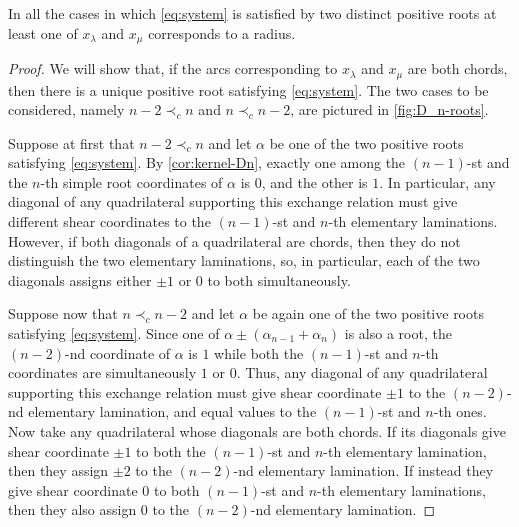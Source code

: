 \documentclass[pdftex]{sigma}
\numberwithin{equation}{section}
\numberwithin{theorem}{section}
\numberwithin{proposition}{section}
\numberwithin{lemma}{section}
\numberwithin{corollary}{section}
\numberwithin{definition}{section}
\numberwithin{example}{section}
\numberwithin{remark}{section}
\numberwithin{note}{section}
\begin{document}
  \begin{lemma}
    \label{lem:is-radius}
    In all the cases in which \cref{eq:system} is satisfied by two distinct positive roots at least one of $x_\lambda$ and $x_\mu$ corresponds to a radius.
  \end{lemma}
  \begin{proof}
    We will show that, if the arcs corresponding to $x_\lambda$ and $x_\mu$ are both chords, then there is a unique positive root satisfying \cref{eq:system}.
    The two cases to be considered, namely $n-2 \prec_c n$ and  $n \prec_c n-2$, are pictured in \cref{fig:D_n-roots}.

    Suppose at first that $n-2 \prec_c n$ and let $\alpha$ be one of the two positive roots satisfying \cref{eq:system}.
    By \cref{cor:kernel-Dn}, exactly one among the $(n-1)$-st and the $n$-th simple root coordinates of $\alpha$ is $0$, and the other is $1$.
    In particular, any diagonal of any quadrilateral supporting this exchange relation must give different shear coordinates to the $(n-1)$-st and $n$-th elementary laminations.
    However, if both diagonals of a quadrilateral are chords, then they do not distinguish the two elementary laminations, so, in particular, each of the two diagonals assigns either $\pm 1$ or $0$ to both simultaneously.

    Suppose now that $n \prec_c n-2$ and let $\alpha$ be again one of the two positive roots satisfying \cref{eq:system}.
    Since one of $\alpha\pm(\alpha_{n-1}+\alpha_n)$ is also a root, the $(n-2)$-nd coordinate of $\alpha$ is $1$ while both the $(n-1)$-st and $n$-th coordinates are simultaneously $1$ or $0$.
    Thus, any diagonal of any quadrilateral supporting this exchange relation must give shear coordinate $\pm 1$ to the $(n-2)$-nd elementary lamination, and equal values to the $(n-1)$-st and $n$-th ones.
    Now take any quadrilateral whose diagonals are both chords.
    If its diagonals give shear coordinate $\pm 1$ to both the $(n-1)$-st and $n$-th elementary lamination, then they assign $\pm 2$ to the $(n-2)$-nd elementary lamination.
    If instead they give shear coordinate $0$ to both $(n-1)$-st and $n$-th elementary laminations, then they also assign $0$ to the $(n-2)$-nd elementary lamination.
  \end{proof}
\end{document}
